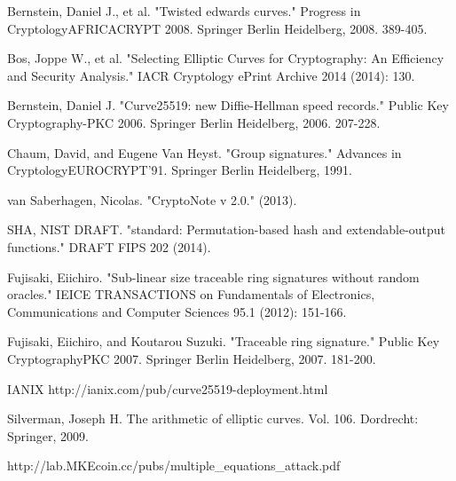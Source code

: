 \documentclass[12pt,english]{mrl}
\numberwithin{equation}{section}
\numberwithin{figure}{section}
\begin{document}
\begin{thebibliography}{BBJLP}
 Bernstein, Daniel J., et al. "Twisted
edwards curves." Progress in Cryptology\textendash{}AFRICACRYPT
2008. Springer Berlin Heidelberg, 2008. 389-405.

 Bos, Joppe W., et al. "Selecting
Elliptic Curves for Cryptography: An Efficiency and Security Analysis."
IACR Cryptology ePrint Archive 2014 (2014): 130.

 Bernstein, Daniel J. "Curve25519:
new Diffie-Hellman speed records." Public Key Cryptography-PKC
2006. Springer Berlin Heidelberg, 2006. 207-228.

 Chaum, David, and Eugene Van Heyst. "Group
signatures." Advances in Cryptology\textemdash{}EUROCRYPT\textquoteright{}91.
Springer Berlin Heidelberg, 1991.

 van Saberhagen, Nicolas. "CryptoNote
v 2.0." (2013).

 SHA, NIST DRAFT. "standard: Permutation-based
hash and extendable-output functions." DRAFT FIPS 202
(2014).

 Fujisaki, Eiichiro. "Sub-linear size
traceable ring signatures without random oracles." IEICE
TRANSACTIONS on Fundamentals of Electronics, Communications and Computer
Sciences 95.1 (2012): 151-166.

 Fujisaki, Eiichiro, and Koutarou Suzuki. "Traceable
ring signature." Public Key Cryptography\textendash{}PKC
2007. Springer Berlin Heidelberg, 2007. 181-200.

 IANIX http://ianix.com/pub/curve25519-deployment.html

 Silverman, Joseph H. The arithmetic of elliptic
curves. Vol. 106. Dordrecht: Springer, 2009.

 http://lab.MKEcoin.cc/pubs/multiple\_equations\_attack.pdf\end{thebibliography}
\end{document}
